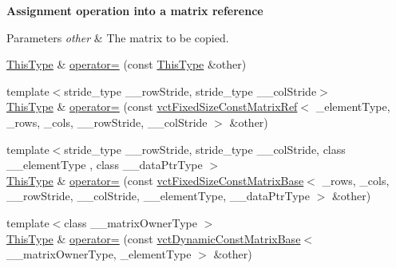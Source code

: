 \begin{Indent}{\bf Assignment operation into a matrix reference}\par
{\em 
\begin{DoxyParams}{Parameters}
{\em other} & The matrix to be copied. \\
\hline
\end{DoxyParams}
}\begin{DoxyCompactItemize}
\item 
\hyperlink{classvct_fixed_size_matrix_ref_a29a621c8e22f250f9033e539ad219f95}{This\-Type} \& \hyperlink{classvct_fixed_size_matrix_ref_a9876d6b470ee918dc7ab454fdeeda582}{operator=} (const \hyperlink{classvct_fixed_size_matrix_ref_a29a621c8e22f250f9033e539ad219f95}{This\-Type} \&other)
\item 
{\footnotesize template$<$stride\-\_\-type \-\_\-\-\_\-row\-Stride, stride\-\_\-type \-\_\-\-\_\-col\-Stride$>$ }\\\hyperlink{classvct_fixed_size_matrix_ref_a29a621c8e22f250f9033e539ad219f95}{This\-Type} \& \hyperlink{classvct_fixed_size_matrix_ref_a4c3e05d0a8dfa378946e1871e12f4b0b}{operator=} (const \hyperlink{classvct_fixed_size_const_matrix_ref}{vct\-Fixed\-Size\-Const\-Matrix\-Ref}$<$ \-\_\-element\-Type, \-\_\-rows, \-\_\-cols, \-\_\-\-\_\-row\-Stride, \-\_\-\-\_\-col\-Stride $>$ \&other)
\item 
{\footnotesize template$<$stride\-\_\-type \-\_\-\-\_\-row\-Stride, stride\-\_\-type \-\_\-\-\_\-col\-Stride, class \-\_\-\-\_\-element\-Type , class \-\_\-\-\_\-data\-Ptr\-Type $>$ }\\\hyperlink{classvct_fixed_size_matrix_ref_a29a621c8e22f250f9033e539ad219f95}{This\-Type} \& \hyperlink{classvct_fixed_size_matrix_ref_a4d2c04a081b66662b946158b08722180}{operator=} (const \hyperlink{classvct_fixed_size_const_matrix_base}{vct\-Fixed\-Size\-Const\-Matrix\-Base}$<$ \-\_\-rows, \-\_\-cols, \-\_\-\-\_\-row\-Stride, \-\_\-\-\_\-col\-Stride, \-\_\-\-\_\-element\-Type, \-\_\-\-\_\-data\-Ptr\-Type $>$ \&other)
\item 
{\footnotesize template$<$class \-\_\-\-\_\-matrix\-Owner\-Type $>$ }\\\hyperlink{classvct_fixed_size_matrix_ref_a29a621c8e22f250f9033e539ad219f95}{This\-Type} \& \hyperlink{classvct_fixed_size_matrix_ref_a0d53de47be9039e41882bc972de772ac}{operator=} (const \hyperlink{classvct_dynamic_const_matrix_base}{vct\-Dynamic\-Const\-Matrix\-Base}$<$ \-\_\-\-\_\-matrix\-Owner\-Type, \-\_\-element\-Type $>$ \&other)
\end{DoxyCompactItemize}
\end{Indent}
